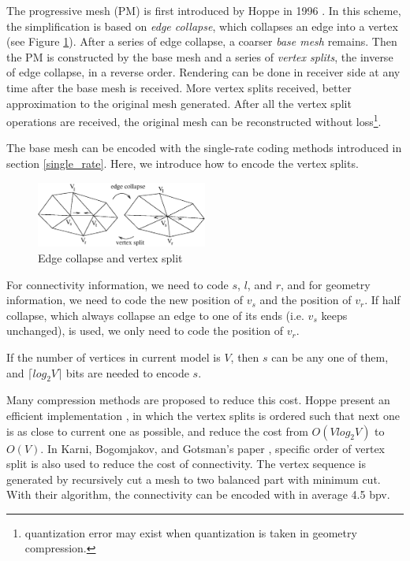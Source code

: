 \documentclass[11pt, a4paper]{report}
\begin{document}
    The progressive mesh (PM) \label{progressive_mesh}is first
    introduced by Hoppe in 1996 \cite{hoppe96progressive}. In this
    scheme, the simplification is based on \emph{edge collapse}, which
    collapses an edge into a vertex (see Figure \ref{split2}).
    After a series of edge collapse, a coarser \emph{base mesh} remains. 
    Then the PM is constructed by the base mesh and a series of \emph{vertex
    splits}, the inverse of edge collapse, in a reverse order.
    Rendering can be done in receiver side at any time after the base
    mesh is received. More vertex splits received, better
    approximation to the original mesh generated. After all
    the vertex split operations are received, the original mesh can be
    reconstructed without loss\footnote{quantization error may exist
    when quantization is taken in geometry compression.}.

    The base mesh can be encoded with the single-rate coding methods
    introduced in section \ref{single_rate}. Here, we introduce
    how to encode the vertex splits. 
\begin{figure}
\centering
\includegraphics[width=0.5\textwidth]{split2.eps}
\caption{Edge collapse and vertex split}\label{split2}
\end{figure}
    For connectivity
    information, we need to code $s$, $l$, and $r$, and for geometry
    information, we need to code the new position of $v_{s}$ and the
    position of $v_{r}$. If half collapse, which always collapse an
    edge to one of its ends (i.e. $v_{s}$ keeps unchanged), is used, 
    we only need to code the position of $v_r$. 
    
    If the number of vertices in current model is
    $V$, then $s$ can be any one of them, 
    and ${\lceil}log_{2}V{\rceil}$ bits are needed to encode $s$. 
    
    Many compression methods are proposed to reduce this cost.
    Hoppe \cite{efficient:hoppe} present an efficient implementation
    , in which the vertex splits is ordered such that next one
    is as close to current one as possible, and reduce the cost
    from $O(Vlog_{2}V)$ to $O(V)$.
    In Karni, Bogomjakov, and Gotsman's paper \cite{602153}, 
    specific order of vertex split is also used to reduce the cost of connectivity. 
    The vertex sequence is generated by recursively cut a mesh to two
    balanced part with minimum cut. With their algorithm, the connectivity can
    be encoded with in average 4.5 bpv. 
\end{document}
